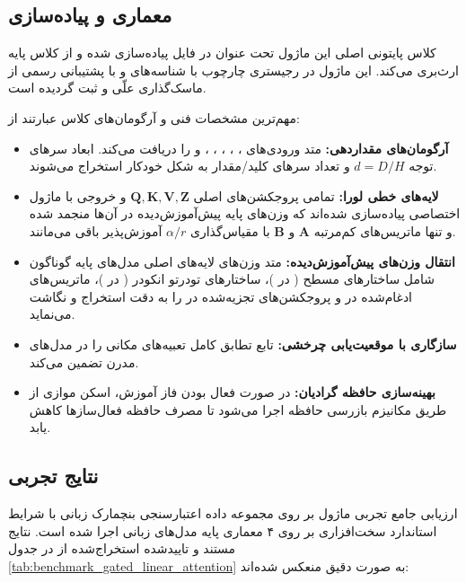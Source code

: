\subsection{معماری و پیاده‌سازی}
کلاس پایتونی اصلی این ماژول تحت عنوان  در فایل  پیاده‌سازی شده و از کلاس پایه  ارث‌بری می‌کند. این ماژول در رجیستری چارچوب با شناسه‌های  و  با پشتیبانی رسمی از ماسک‌گذاری علّی و  ثبت گردیده است.

مهم‌ترین مشخصات فنی و آرگومان‌های کلاس عبارتند از:
\begin{itemize}
    \item \textbf{آرگومان‌های مقداردهی:} متد  ورودی‌های ، ، ، ، ،  و  را دریافت می‌کند. ابعاد سرهای توجه $d = D/H$ و تعداد سرهای کلید/مقدار به شکل خودکار استخراج می‌شوند.
    \item \textbf{لایه‌های خطی لورا:} تمامی پروجکشن‌های اصلی $\mathbf{Q}, \mathbf{K}, \mathbf{V}, \mathbf{Z}$ و خروجی با ماژول اختصاصی  پیاده‌سازی شده‌اند که وزن‌های پایه پیش‌آموزش‌دیده در آن‌ها منجمد  شده و تنها ماتریس‌های کم‌مرتبه $\mathbf{A}$ و $\mathbf{B}$ با مقیاس‌گذاری $\alpha / r$ آموزش‌پذیر باقی می‌مانند.
    \item \textbf{انتقال وزن‌های پیش‌آموزش‌دیده:} متد  وزن‌های لایه‌های اصلی مدل‌های پایه گوناگون شامل ساختارهای مسطح ( در )، ساختارهای تودرتو انکودر ( در )، ماتریس‌های ادغام‌شده  در  و پروجکشن‌های تجزیه‌شده  در  را به دقت استخراج و نگاشت می‌نماید.
    \item \textbf{سازگاری با موقعیت‌یابی چرخشی:} تابع  تطابق کامل تعبیه‌های مکانی  را در مدل‌های مدرن تضمین می‌کند.
    \item \textbf{بهینه‌سازی حافظه گرادیان:} در صورت فعال بودن فاز آموزش، اسکن موازی  از طریق مکانیزم بازرسی حافظه  اجرا می‌شود تا مصرف حافظه فعال‌سازها کاهش یابد.
\end{itemize}

\subsection{نتایج تجربی}
ارزیابی جامع تجربی ماژول  بر روی مجموعه داده اعتبارسنجی بنچمارک زبانی  با شرایط استاندارد سخت‌افزاری بر روی ۴ معماری پایه مدل‌های زبانی اجرا شده است. نتایج مستند و تاییدشده استخراج‌شده از  در جدول \ref{tab:benchmark_gated_linear_attention} به صورت دقیق منعکس شده‌اند:

